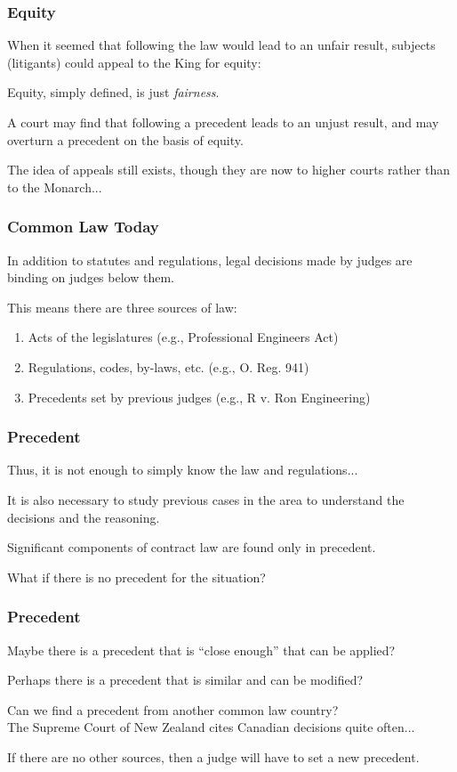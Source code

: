\begin{frame}
\frametitle{Equity}

When it seemed that following the law would lead to an unfair result, subjects (litigants) could appeal to the King for \alert{equity}:

Equity, simply defined, is just \textit{fairness}.

A court may find that following a precedent leads to an unjust result, and may overturn a precedent on the basis of equity.

The idea of appeals still exists, though they are now to higher courts rather than to the Monarch...

\end{frame}



\begin{frame}
\frametitle{Common Law Today}

In addition to statutes and regulations, legal decisions made by judges are binding on judges below them.


This means there are three sources of law:
\begin{enumerate}
	\item Acts of the legislatures (e.g., Professional Engineers Act)
	\item Regulations, codes, by-laws, etc. (e.g., O. Reg. 941)
	\item Precedents set by previous judges (e.g., R v. Ron Engineering)
\end{enumerate}

\end{frame}



\begin{frame}
\frametitle{Precedent}

Thus, it is not enough to simply know the law and regulations...

It is also necessary to study previous cases in the area to understand the decisions and the reasoning.

Significant components of contract law are found only in precedent.

What if there is no precedent for the situation?

\end{frame}



\begin{frame}
\frametitle{Precedent}

Maybe there is a precedent that is ``close enough'' that can be applied?

Perhaps there is a precedent that is similar and can be modified?

Can we find a precedent from another common law country?\\
\quad The Supreme Court of New Zealand cites Canadian decisions quite often...

If there are no other sources, then a judge will have to set a new precedent.

\end{frame}



